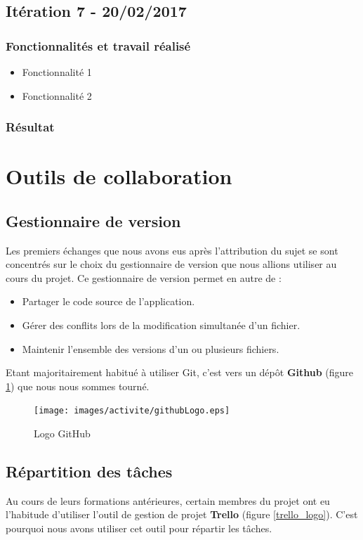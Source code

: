 \subsection{Itération 7 - 20/02/2017}
\subsubsection{Fonctionnalités et travail réalisé}
\begin{itemize}
\item Fonctionnalité 1
\item Fonctionnalité 2 
\end{itemize}

\subsubsection{Résultat}


\section{Outils de collaboration}

\subsection{Gestionnaire de version}
Les premiers échanges que nous avons eus après l'attribution du sujet se sont concentrés sur le choix du gestionnaire de version que nous allions utiliser au cours du projet. Ce gestionnaire de version permet en autre de :
\begin{itemize}
\item Partager le code source de l'application.
\item Gérer des conflits lors de la modification simultanée d'un fichier.
\item Maintenir l'ensemble des versions d'un ou plusieurs fichiers.\\
\end{itemize}

Etant majoritairement habitué à utiliser Git, c'est vers un dép\^ot \textbf{Github} (figure \ref{github_logo}) que nous nous sommes tourné.

\begin{figure}[H]
\centering
\texttt{[image: images/activite/githubLogo.eps]}
\caption{Logo GitHub}
\label{github_logo}
\end{figure}



\subsection{Répartition des tâches}
Au cours de leurs formations antérieures, certain membres du projet ont eu l'habitude d'utiliser l'outil de gestion de projet \textbf{Trello} (figure \ref{trello_logo}). C'est pourquoi nous avons utiliser cet outil pour répartir les tâches.\\

